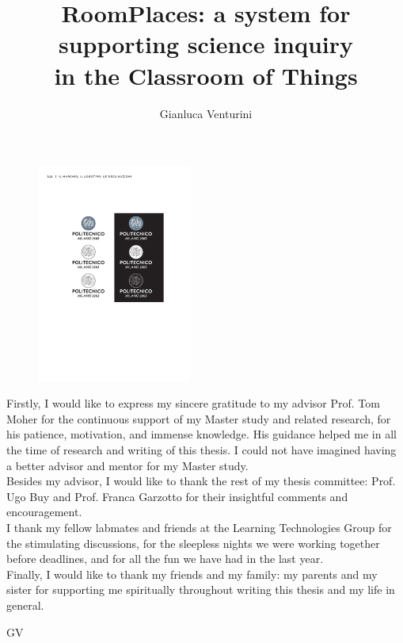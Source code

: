\documentclass{polimithesi}
\begin{document}

\title{RoomPlaces: a system for supporting science inquiry\\ in the Classroom of Things}

\begin{figure}
\centering
\includegraphics[width=2in]{images/poli_logo.pdf}
\end{figure}

\author{Gianluca Venturini}
\maketitle


\acknowledgements
{Firstly, I would like to express my sincere gratitude to my advisor Prof. Tom Moher for the continuous support of my Master study and related research, for his patience, motivation, and immense knowledge. His guidance helped me in all the time of research and writing of this thesis. I could not have imagined having a better advisor and mentor for my Master study.\\
Besides my advisor, I would like to thank the rest of my thesis committee: Prof. Ugo Buy and Prof. Franca Garzotto for their insightful comments and encouragement.\\
I thank my fellow labmates and friends at the Learning Technologies Group for the stimulating discussions, for the sleepless nights we were working together before deadlines, and for all the fun we have had in the last year.\\
Finally, I would like to thank my friends and my family: my parents and my sister for supporting me spiritually throughout writing this thesis and my life in general.

\begin{flushright}
GV %
\end{flushright}}
\end{document}
